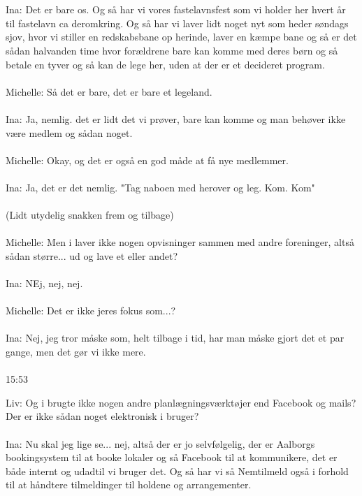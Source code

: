 \\\\
Ina: Det er bare os. Og så har vi vores fastelavnsfest som vi holder her hvert år til fastelavn ca deromkring. Og så har vi laver lidt noget nyt som heder søndags sjov, hvor vi stiller en redskabsbane op herinde, laver en kæmpe bane og så er det sådan halvanden time hvor forældrene bare kan komme med deres børn og så betale en tyver og så kan de lege her, uden at  der er et decideret program. 
\\\\
Michelle: Så det er bare, det er bare et legeland.
\\\\
Ina: Ja, nemlig. det er lidt det vi prøver, bare kan komme og man behøver ikke være medlem og sådan noget. \\\\
Michelle: Okay, og det er også en god måde at få nye medlemmer.
\\\\
Ina: Ja, det er det nemlig. "Tag naboen med herover og leg. Kom. Kom"
\\\\
(Lidt utydelig snakken frem og tilbage)
\\\\
Michelle: Men i laver ikke nogen opvisninger sammen med andre foreninger, altså sådan større... ud og lave et eller andet?
\\\\
Ina: NEj, nej, nej.
\\\\
Michelle: Det er ikke jeres fokus som...?
\\\\
Ina: Nej, jeg tror måske som, helt tilbage i tid, har man måske gjort det et par gange, men det gør vi ikke mere.
\\\\
15:53
\par
Liv: Og i brugte ikke nogen  andre planlægningsværktøjer end Facebook og mails? Der er ikke sådan noget elektronisk i bruger?
\\\\
Ina: Nu skal jeg lige se... nej, altså der er jo selvfølgelig, der er Aalborgs bookingsystem til at booke lokaler og så Facebook til at kommunikere, det er både internt og udadtil vi bruger det. Og så har vi så Nemtilmeld også i forhold til at håndtere tilmeldinger til holdene og arrangementer. 
\\\\
